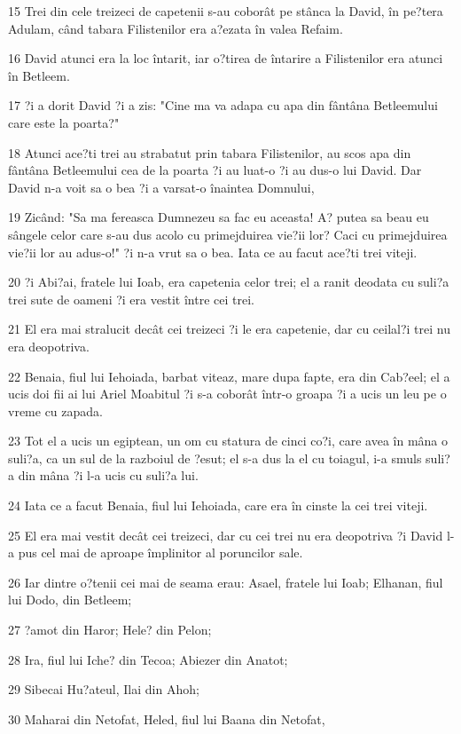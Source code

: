 \par 15 Trei din cele treizeci de capetenii s-au coborât pe stânca la David, în pe?tera Adulam, când tabara Filistenilor era a?ezata în valea Refaim.
\par 16 David atunci era la loc întarit, iar o?tirea de întarire a Filistenilor era atunci în Betleem.
\par 17 ?i a dorit David ?i a zis: "Cine ma va adapa cu apa din fântâna Betleemului care este la poarta?"
\par 18 Atunci ace?ti trei au strabatut prin tabara Filistenilor, au scos apa din fântâna Betleemului cea de la poarta ?i au luat-o ?i au dus-o lui David. Dar David n-a voit sa o bea ?i a varsat-o înaintea Domnului,
\par 19 Zicând: "Sa ma fereasca Dumnezeu sa fac eu aceasta! A? putea sa beau eu sângele celor care s-au dus acolo cu primejduirea vie?ii lor? Caci cu primejduirea vie?ii lor au adus-o!" ?i n-a vrut sa o bea. Iata ce au facut ace?ti trei viteji.
\par 20 ?i Abi?ai, fratele lui Ioab, era capetenia celor trei; el a ranit deodata cu suli?a trei sute de oameni ?i era vestit între cei trei.
\par 21 El era mai stralucit decât cei treizeci ?i le era capetenie, dar cu ceilal?i trei nu era deopotriva.
\par 22 Benaia, fiul lui Iehoiada, barbat viteaz, mare dupa fapte, era din Cab?eel; el a ucis doi fii ai lui Ariel Moabitul ?i s-a coborât într-o groapa ?i a ucis un leu pe o vreme cu zapada.
\par 23 Tot el a ucis un egiptean, un om cu statura de cinci co?i, care avea în mâna o suli?a, ca un sul de la razboiul de ?esut; el s-a dus la el cu toiagul, i-a smuls suli?a din mâna ?i l-a ucis cu suli?a lui.
\par 24 Iata ce a facut Benaia, fiul lui Iehoiada, care era în cinste la cei trei viteji.
\par 25 El era mai vestit decât cei treizeci, dar cu cei trei nu era deopotriva ?i David l-a pus cel mai de aproape împlinitor al poruncilor sale.
\par 26 Iar dintre o?tenii cei mai de seama erau: Asael, fratele lui Ioab; Elhanan, fiul lui Dodo, din Betleem;
\par 27 ?amot din Haror; Hele? din Pelon;
\par 28 Ira, fiul lui Iche? din Tecoa; Abiezer din Anatot;
\par 29 Sibecai Hu?ateul, Ilai din Ahoh;
\par 30 Maharai din Netofat, Heled, fiul lui Baana din Netofat,
